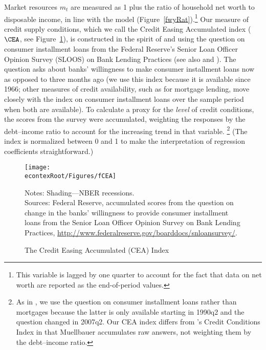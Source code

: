 \documentclass[titlepage]{\econtex}
\begin{document}
Market resources $m_t$ are measured as 1 plus the ratio of household net worth to disposable income, in line with the model (Figure~\ref{fwyRat}).\footnote{This variable is lagged by one quarter to account for the fact that data on net worth are reported as the end-of-period values.}  Our measure of credit supply conditions, which we call the Credit Easing Accumulated index ($\CEA$, see Figure~\ref{fCEA}), is constructed in the spirit of \cite{mue07} and \cite{ducaEtAl10_creditArch} using the question on consumer installment loans from the Federal Reserve's Senior Loan Officer Opinion Survey (SLOOS) on Bank Lending Practices (see also \cite{fernandezMuellbauer06} and \cite{hall:slump}).  The question asks about banks' willingness to make consumer installment loans now as opposed to three months ago (we use this index because it is available since 1966; other measures of credit availability, such as for mortgage lending, move closely with the index on consumer installment loans over the sample period when both are available). To calculate a proxy for the \emph{level} of credit conditions, the scores from the survey were accumulated, weighting the responses by the debt--income ratio to account for the increasing trend in that variable.%
\footnote{  As in \cite{mue07}, we use the question on consumer installment
  loans rather than mortgages because the latter is only available
  starting in 1990q2 and the question changed in 2007q2.
  Our CEA index differs from \cite{mue07}'s Credit Conditions Index in that Muellbauer accumulates raw answers, not weighting them by the debt--income ratio.
}
  (The index is normalized between 0 and 1 to make the interpretation of regression coefficients straightforward.)

  \hypertarget{fCEA}{}
  \begin{figure}
\caption{The Credit Easing Accumulated (CEA) Index}
\label{fCEA}
\texttt{[image: \\econtexRoot/Figures/fCEA]}

\footnotesize
Notes: Shading---NBER recessions.\\[0mm]
\tiny Sources: Federal Reserve, accumulated scores from the question on change in the banks' willingness to provide consumer installment loans from the Senior Loan Officer Opinion Survey on Bank Lending Practices, \url{http://www.federalreserve.gov/boarddocs/snloansurvey/}.
\end{figure}
\end{document}
